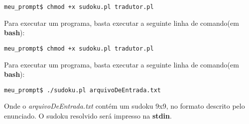 \documentclass[11pt]{article}
\begin{document}
\begin{verbatim}
meu_prompt$ chmod +x sudoku.pl tradutor.pl
\end{verbatim}

Para executar um programa, basta executar a seguinte linha de comando(em \textbf{\color{red}bash}):


\begin{verbatim}
meu_prompt$ chmod +x sudoku.pl tradutor.pl
\end{verbatim}

Para executar um programa, basta executar a seguinte linha de comando(em \textbf{\color{red}bash}):

\begin{verbatim}
meu_prompt$ ./sudoku.pl arquivoDeEntrada.txt
\end{verbatim}

Onde o \emph{arquivoDeEntrada.txt} contém um sudoku 9x9, no formato descrito pelo enunciado. O sudoku resolvido será impresso na \textbf{\color{red}stdin}.
\end{document}
